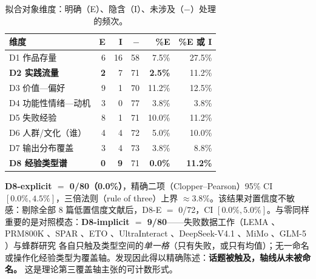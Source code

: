 \documentclass[10pt,fontset=fandol]{ctexart}
\newcommand{\dminus}{-}
\begin{document}
\begin{table}[t]
\centering
\caption{拟合对象维度：明确（E）、隐含（I）、未涉及（$\dminus$）处理的频次。}
\label{tab:dimensions}
\begin{tabular}{lrrrrr}
\toprule
维度 & E & I & $\dminus$ & \%E & \%E 或 I \\
\midrule
D1 作品存量                        & 6 & 16 & 58 & 7.5\%  & 27.5\% \\
\textbf{D2 实践流量}               & \textbf{2} & 7 & 71 & \textbf{2.5\%} & 11.2\% \\
D3 价值—偏好                       & 9 & 1  & 70 & 11.2\% & 12.5\% \\
D4 功能性情绪—动机                 & 3 & 0  & 77 & 3.8\%  & 3.8\% \\
D5 失败经验                         & 8 & 1  & 71 & 10.0\% & 11.2\% \\
D6 人群/文化（谁）                 & 4 & 4  & 72 & 5.0\%  & 10.0\% \\
D7 输出分布覆盖                    & 3 & 4  & 73 & 3.8\%  & 8.8\% \\
\textbf{D8 经验类型谱}             & \textbf{0} & \textbf{9} & 71 & \textbf{0.0\%} & \textbf{11.2\%} \\
\bottomrule
\end{tabular}
\end{table}

\textbf{D8-explicit $=$ 0/80（0.0\%）}，精确二项（Clopper--Pearson）95\% CI $[0.0\%, 4.5\%]$，三倍法则（rule of three）上界 $\approx 3.8\%$。该结果对置信度不敏感：剔除全部 8 篇低置信度文献后，D8-E $=$ 0/72，CI $[0.0\%, 5.0\%]$。与零同样重要的是对照模态：\textbf{D8-implicit $=$ 9/80}——失败数据工作（LEMA \cite{an2023lema}、PRM800K \cite{lightman2024verify}、SPAR \cite{spar2026f26}、ETO \cite{song2024trial}、UltraInteract \cite{yuan2024advancing}、DeepSeek-V4.1 \cite{deepseek2026v41}、MiMo \cite{xiaomi2026mimo}、GLM-5 \cite{zai2026glm5}）与蜂群研究 \cite{jiang2025hivemind} 各自只触及类型空间的\emph{单一格}（只有失败，或只有均值）；无一命名或操作化经验类型为覆盖轴。发现因此得以精确陈述：\textbf{话题被触及，轴线从未被命名。} 这是理论第三覆盖轴主张的可计数形式。
\end{document}
